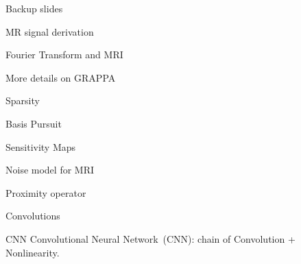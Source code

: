 \appendix

\begin{frame}{}
    Backup slides
\end{frame}

\begin{frame}{MR signal derivation}
    
\end{frame}

\begin{frame}{Fourier Transform and MRI}
    
\end{frame}

\begin{frame}{More details on GRAPPA}
    
\end{frame}

\begin{frame}{Sparsity}
    
\end{frame}

\begin{frame}{Basis Pursuit}
    
\end{frame}

\begin{frame}{Sensitivity Maps}
    
\end{frame}

\begin{frame}{Noise model for MRI}
    
\end{frame}

\begin{frame}{Proximity operator}
    
\end{frame}

\begin{frame}{Convolutions}
    
\end{frame}

\begin{frame}{CNN}
    Convolutional Neural Network~(CNN): chain of Convolution + Nonlinearity.
\end{frame}

